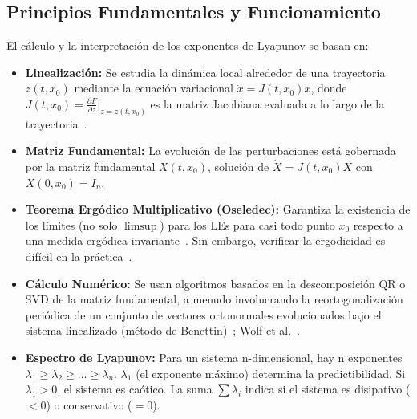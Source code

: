 \subsection{Principios Fundamentales y Funcionamiento}

El cálculo y la interpretación de los exponentes de Lyapunov se basan en:
\begin{itemize}
    \item \textbf{Linealización:} Se estudia la dinámica local alrededor de una trayectoria $z(t, x_0)$ mediante la ecuación variacional $\dot{x} = J(t, x_0)x$, donde $J(t, x_0) = \frac{\partial F}{\partial z}|_{z=z(t, x_0)}$ es la matriz Jacobiana evaluada a lo largo de la trayectoria~\cite{Kuznetsov2016}.
    \item \textbf{Matriz Fundamental:} La evolución de las perturbaciones está gobernada por la matriz fundamental $X(t, x_0)$, solución de $\dot{X} = J(t, x_0)X$ con $X(0, x_0) = I_n$.
    \item \textbf{Teorema Ergódico Multiplicativo (Oseledec):} Garantiza la existencia de los límites (no solo $\limsup$) para los LEs para casi todo punto $x_0$ respecto a una medida ergódica invariante~\cite{Oseledec1968, Pesin1977}. Sin embargo, verificar la ergodicidad es difícil en la práctica~\cite{Kuznetsov2016}.
    \item \textbf{Cálculo Numérico:} Se usan algoritmos basados en la descomposición QR o SVD de la matriz fundamental, a menudo involucrando la reortogonalización periódica de un conjunto de vectores ortonormales evolucionados bajo el sistema linealizado (método de Benettin)~\cite{Benettin1980}; Wolf et al.~\cite{Wolf1985, Quarles2011}.
    \item \textbf{Espectro de Lyapunov:} Para un sistema n-dimensional, hay n exponentes $\lambda_1 \ge \lambda_2 \ge \ldots \ge \lambda_n$. $\lambda_1$ (el exponente máximo) determina la predictibilidad. Si $\lambda_1 > 0$, el sistema es caótico. La suma $\sum \lambda_i$ indica si el sistema es disipativo ($<0$) o conservativo ($=0$).
\end{itemize}

